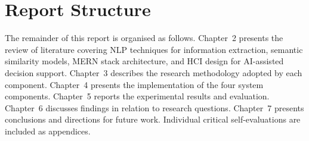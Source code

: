 \section{Report Structure}

The remainder of this report is organised as follows. Chapter~2 presents the review of literature covering NLP techniques for information extraction, semantic similarity models, MERN stack architecture, and HCI design for AI-assisted decision support. Chapter~3 describes the research methodology adopted by each component. Chapter~4 presents the implementation of the four system components. Chapter~5 reports the experimental results and evaluation. Chapter~6 discusses findings in relation to research questions. Chapter~7 presents conclusions and directions for future work. Individual critical self-evaluations are included as appendices.
